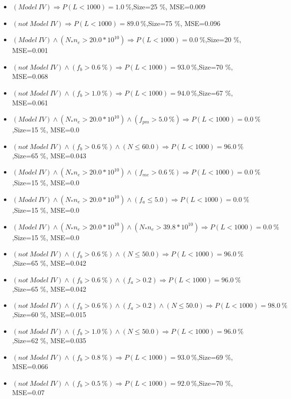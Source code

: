 \documentclass[numbered]{CSL}
\begin{document}
\begin{itemize}
\item $(Model~IV) \Rightarrow P(L < 1 000) = 1.0~\%$,\hfill Size=25 \%, MSE=0.009
\item $(not~Model~IV) \Rightarrow P(L < 1 000) = 89.0~\%$,\hfill Size=75 \%, MSE=0.096
\item $(Model~IV) \land (N_* n_e > 20.0 * 10^{10}) \Rightarrow P(L < 1 000) = 0.0~\%$,\hfill Size=20 \%, MSE=0.001
\item $(not~Model~IV) \land (f_b > 0.6~\%) \Rightarrow P(L < 1 000) = 93.0~\%$,\hfill Size=70 \%, MSE=0.068
\item $(not~Model~IV) \land (f_b > 1.0~\%) \Rightarrow P(L < 1 000) = 94.0~\%$,\hfill Size=67 \%, MSE=0.061
\item $(Model~IV) \land (N_* n_e > 20.0 * 10^{10}) \land (f_{pm} > 5.0~\%) \Rightarrow P(L < 1 000) = 0.0~\%$,\hfill Size=15 \%, MSE=0.0
\item $(not~Model~IV) \land (f_b > 0.6~\%) \land (N \leq 60.0) \Rightarrow P(L < 1 000) = 96.0~\%$,\hfill Size=65 \%, MSE=0.043
\item $(Model~IV) \land (N_* n_e > 20.0 * 10^{10}) \land (f_{me} > 0.6~\%) \Rightarrow P(L < 1 000) = 0.0~\%$,\hfill Size=15 \%, MSE=0.0
\item $(Model~IV) \land (N_* n_e > 20.0 * 10^{10}) \land (f_a \leq 5.0) \Rightarrow P(L < 1 000) = 0.0~\%$,\hfill Size=15 \%, MSE=0.0
\item $(Model~IV) \land (N_* n_e > 20.0 * 10^{10}) \land (N_* n_e > 39.8 * 10^{10}) \Rightarrow P(L < 1 000) = 0.0~\%$,\hfill Size=15 \%, MSE=0.0
\item $(not~Model~IV) \land (f_b > 0.6~\%) \land (N \leq 50.0) \Rightarrow P(L < 1 000) = 96.0~\%$,\hfill Size=65 \%, MSE=0.042
\item $(not~Model~IV) \land (f_b > 0.6~\%) \land (f_a > 0.2) \Rightarrow P(L < 1 000) = 96.0~\%$,\hfill Size=65 \%, MSE=0.042
\item $(not~Model~IV) \land (f_b > 0.6~\%) \land (f_a > 0.2) \land (N \leq 50.0) \Rightarrow P(L < 1 000) = 98.0~\%$,\hfill Size=60 \%, MSE=0.015
\item $(not~Model~IV) \land (f_b > 1.0~\%) \land (N \leq 50.0) \Rightarrow P(L < 1 000) = 96.0~\%$,\hfill Size=62 \%, MSE=0.035
\item $(not~Model~IV) \land (f_b > 0.8~\%) \Rightarrow P(L < 1 000) = 93.0~\%$,\hfill Size=69 \%, MSE=0.066
\item $(not~Model~IV) \land (f_b > 0.5~\%) \Rightarrow P(L < 1 000) = 92.0~\%$,\hfill Size=70 \%, MSE=0.07

\end{itemize}
\end{document}

